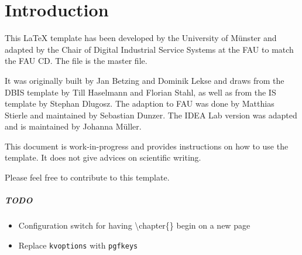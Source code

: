 \chapter{Introduction}
This \LaTeX \- template has been developed by the University of M\"unster and adapted by the Chair of Digital Industrial Service Systems at the \gls{FAU} to match the \gls{FAU} \gls{CD}. The file  is the master file.

It was originally built by  Jan Betzing and Dominik Lekse and draws from the DBIS template by Till Haselmann and Florian Stahl, as well as from the IS template by Stephan Dlugosz. The adaption to FAU was done by Matthias Stierle and maintained by Sebastian Dunzer. The IDEA Lab version was adapted and is maintained by Johanna M\"uller.

This document is work-in-progress and provides instructions on how to use the template. It does not give advices on scientific writing.

Please feel free to contribute to this template.

\paragraph{TODO}
\begin{itemize}
	\item Configuration switch for having \textbackslash chapter\{\} begin on a new page
	\item Replace \texttt{kvoptions} with \texttt{pgfkeys}
\end{itemize}